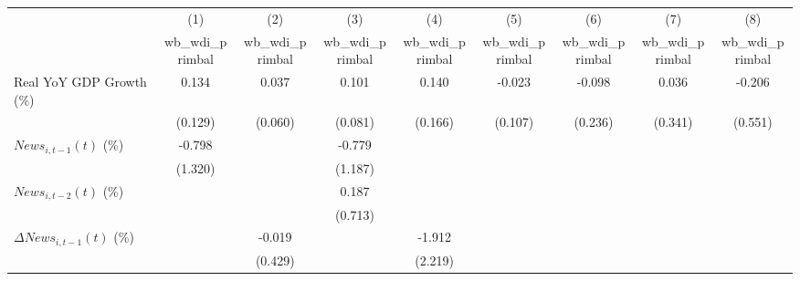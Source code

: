 {
\def\sym#1{\ifmmode^{#1}\else\(^{#1}\)\fi}
\begin{tabular}{l*{8}{c}}
\toprule
                    &\multicolumn{1}{c}{(1)}&\multicolumn{1}{c}{(2)}&\multicolumn{1}{c}{(3)}&\multicolumn{1}{c}{(4)}&\multicolumn{1}{c}{(5)}&\multicolumn{1}{c}{(6)}&\multicolumn{1}{c}{(7)}&\multicolumn{1}{c}{(8)}\\
                    &\multicolumn{1}{c}{wb_wdi_primbal}&\multicolumn{1}{c}{wb_wdi_primbal}&\multicolumn{1}{c}{wb_wdi_primbal}&\multicolumn{1}{c}{wb_wdi_primbal}&\multicolumn{1}{c}{wb_wdi_primbal}&\multicolumn{1}{c}{wb_wdi_primbal}&\multicolumn{1}{c}{wb_wdi_primbal}&\multicolumn{1}{c}{wb_wdi_primbal}\\
\midrule
Real YoY GDP Growth (\%)&       0.134         &       0.037         &       0.101         &       0.140         &      -0.023         &      -0.098         &       0.036         &      -0.206         \\
                    &     (0.129)         &     (0.060)         &     (0.081)         &     (0.166)         &     (0.107)         &     (0.236)         &     (0.341)         &     (0.551)         \\
\addlinespace
$ News_{i,t-1}(t)$ (\%)&      -0.798         &                     &      -0.779         &                     &                     &                     &                     &                     \\
                    &     (1.320)         &                     &     (1.187)         &                     &                     &                     &                     &                     \\
\addlinespace
$ News_{i,t-2}(t)$ (\%)&                     &                     &       0.187         &                     &                     &                     &                     &                     \\
                    &                     &                     &     (0.713)         &                     &                     &                     &                     &                     \\
\addlinespace
$ \Delta News_{i,t-1}(t)$ (\%)&                     &      -0.019         &                     &      -1.912         &                     &                     &                     &                     \\
                    &                     &     (0.429)         &                     &     (2.219)         &                     &                     &                     &                     \\

\end{tabular}}
